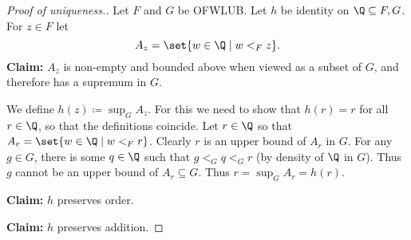 \begin{proof}[Proof of uniqueness.]
    Let $F$ and $G$ be OFWLUB.
    Let $h$ be identity on $\Q \subseteq F, G$.
    For $z \in F$ let \[
        A_z = \set{w \in \Q \mid w <_F z}.
    \]
    \textbf{Claim:} $A_z$ is non-empty and bounded above when viewed as a
    subset of $G$, and therefore has a supremum in $G$.


    We define $h(z) \coloneq \sup_G A_z$.
    For this we need to show that $h(r) = r$ for all $r \in \Q$, so that the
    definitions coincide.
    Let $r \in \Q$ so that $A_r = \set{w \in \Q \mid w <_F r}$.
    Clearly $r$ is an upper bound of $A_r$ in $G$.
    For any $g \in G$, there is some $q \in \Q$ such that $g <_G q <_G r$
    (by density of $\Q$ in $G$).
    Thus $g$ cannot be an upper bound of $A_r \subseteq G$.
    Thus $r = \sup_G A_r = h(r)$.

    \textbf{Claim:} $h$ preserves order.


    \textbf{Claim:} $h$ preserves addition.


\end{proof}
